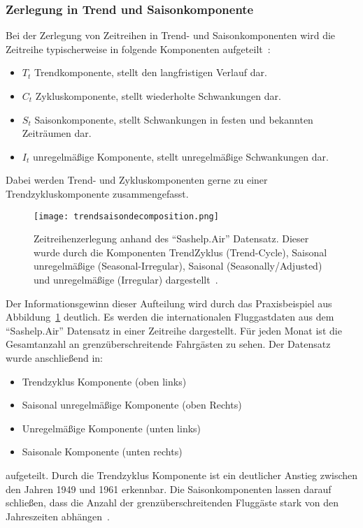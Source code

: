 \subsubsection{Zerlegung in Trend und Saisonkomponente}
Bei der Zerlegung von Zeitreihen in Trend- und Saisonkomponenten wird die Zeitreihe typischerweise in folgende Komponenten aufgeteilt~\cite{Leonard2018}:
\begin{itemize}
  \item $T_t$ Trendkomponente, stellt den langfristigen Verlauf dar.
  \item $C_t$ Zykluskomponente, stellt wiederholte Schwankungen dar.
  \item $S_t$ Saisonkomponente, stellt Schwankungen in festen und bekannten Zeiträumen dar.
  \item $I_t$ unregelmäßige Komponente, stellt unregelmäßige Schwankungen dar.
\end{itemize}
Dabei werden Trend- und Zykluskomponenten gerne zu einer Trendzykluskomponente zusammengefasst.



\begin{figure}
  \centering
  \texttt{[image: trendsaisondecomposition.png]}
  \caption{Zeitreihenzerlegung anhand des \enquote{Sashelp.Air} Datensatz. Dieser wurde durch die Komponenten TrendZyklus (Trend-Cycle), Saisonal unregelmäßige (Seasonal-Irregular), Saisonal (Seasonally/Adjusted) und unregelmäßige (Irregular) dargestellt~\cite{Leonard2018}. }
  \label{fig:trendsaisondecomposition}
\end{figure}

Der Informationsgewinn dieser Aufteilung wird durch das Praxisbeispiel aus Abbildung\ \ref{fig:trendsaisondecomposition} deutlich. 
Es werden die internationalen Fluggastdaten aus dem \enquote{Sashelp.Air} Datensatz in einer Zeitreihe dargestellt. Für jeden Monat ist die Gesamtanzahl an grenzüberschreitende Fahrgästen zu sehen. 
Der Datensatz wurde anschließend in:
\begin{itemize}
  \item Trendzyklus Komponente (oben links)
  \item Saisonal unregelmäßige Komponente (oben Rechts)
  \item Unregelmäßige Komponente (unten links)
  \item Saisonale Komponente (unten rechts)
\end{itemize}
aufgeteilt. 
Durch die Trendzyklus Komponente ist ein deutlicher Anstieg zwischen den Jahren 1949 und 1961 erkennbar. 
Die Saisonkomponenten lassen darauf schließen, dass die Anzahl der grenzüberschreitenden Fluggäste stark von den Jahreszeiten abhängen~\cite{Leonard2018}. 


